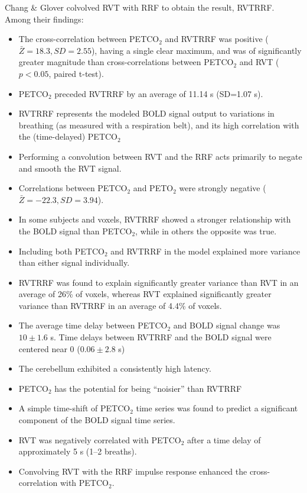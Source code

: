 \documentclass[twoside,twocolumn]{article}
\begin{document}
Chang \& Glover \cite{Chang2009} colvolved RVT with RRF to obtain the result, RVTRRF.  Among their findings:
\begin{itemize}
	\item The cross-correlation between PETCO$_2$ and RVTRRF was positive ($\bar{Z} = 18.3, SD=2.55$), having a single clear maximum, and was of significantly greater magnitude than cross-correlations between PETCO$_2$ and RVT ($p < 0.05$, paired t-test).
	\item PETCO$_2$ preceded RVTRRF by an average of 11.14 s (SD=1.07 s).
	\item RVTRRF represents the modeled BOLD signal output to variations in breathing (as measured with a respiration belt), and its high correlation with the (time-delayed) PETCO$_2$
	\item Performing a convolution between RVT and the RRF acts primarily to negate and smooth the RVT signal.
	\item Correlations between PETCO$_2$ and PETO$_2$ were strongly negative ($\bar{Z} = -22.3, SD=3.94$).
	\item In some subjects and voxels, RVTRRF showed a stronger relationship with the BOLD signal than PETCO$_2$, while in others the opposite was true.
	\item Including both PETCO$_2$ and RVTRRF in the model explained more variance than either signal individually.
	\item RVTRRF was found to explain significantly greater variance than RVT in an average of 26\% of voxels, whereas RVT explained significantly greater variance than RVTRRF in an average of 4.4\% of voxels.
	\item The average time delay between PETCO$_2$ and BOLD signal change was $10 \pm 1.6$ s.  Time delays between RVTRRF and the BOLD signal were centered near 0 ($0.06 \pm 2.8$ s)
	\item The cerebellum exhibited a consistently high latency.
	\item PETCO$_2$ has the potential for being “noisier” than RVTRRF
	\item A simple time-shift of PETCO$_2$ time series was found to predict a significant component of the BOLD signal time series.
	\item RVT was negatively correlated with PETCO$_2$ after a time delay of approximately 5 s (1–2 breaths).
	\item Convolving RVT with the RRF impulse response enhanced the cross-correlation with PETCO$_2$.
\end{itemize}
\end{document}
